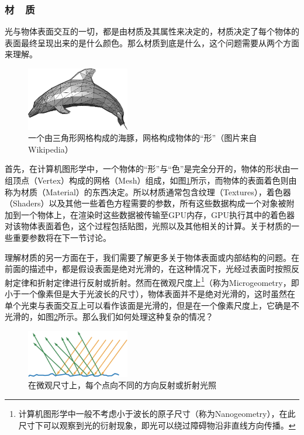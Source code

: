 \subsubsection{材~~质}\label{sec:intro-materials}
光与物体表面交互的一切，都是由材质及其属性来决定的，材质决定了每个物体的表面最终呈现出来的是什么颜色。那么材质到底是什么，这个问题需要从两个方面来理解。

\begin{figure}
\sidecaption
	\includegraphics[width=0.4\textwidth]{figures/intro/mesh}
	\caption{一个由三角形网格构成的海豚，网格构成物体的“形”（图片来自Wikipedia）}
	\label{f:intro-mesh}
\end{figure}

首先，在计算机图形学中，一个物体的“形”与“色”是完全分开的，物体的形状由一组顶点（Vertex）构成的网格（Mesh）组成，如图\ref{f:intro-mesh}所示，而物体的表面着色则由称为材质（Material）的东西决定。所以材质通常包含纹理（Textures），着色器（Shaders）以及其他一些着色方程需要的参数，所有这些数据构成一个对象被附加到一个物体上，在渲染时这些数据被传输至GPU内存，GPU执行其中的着色器对该物体表面着色，这个过程包括贴图，光照以及其他相关的计算。关于材质的一些重要参数将在下一节讨论。

理解材质的另一方面在于，我们需要了解更多关于物体表面或内部结构的问题。在前面的描述中，都是假设表面是绝对光滑的，在这种情况下，光经过表面时按照反射定律和折射定律进行反射或折射。然而在微观尺度上\footnote{计算机图形学中一般不考虑小于波长的原子尺寸（称为Nanogeometry），在此尺寸下可以观察到光的衍射现象，即光可以绕过障碍物沿非直线方向传播。}（称为Microgeometry，即小于一个像素但是大于光波长的尺寸），物体表面并不是绝对光滑的，这时虽然在单个光束与表面交互上可以看作该面是光滑的，但是在一个像素尺度上，它确是不光滑的，如图\ref{f:intro-microgeometry-1}所示。那么我们如何处理这种复杂的情况？

\begin{figure}
\sidecaption
	\includegraphics[width=0.4\textwidth]{figures/intro/ray-optics-3}
	\caption{在微观尺寸上，每个点向不同的方向反射或折射光照}
	\label{f:intro-microgeometry-1}
\end{figure}

